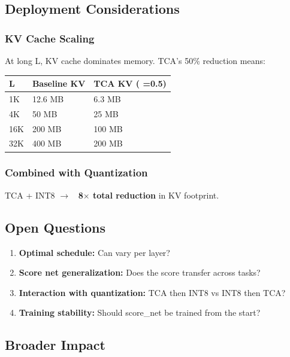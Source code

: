 \subsection{Deployment Considerations}

\subsubsection{KV Cache Scaling}

At long L, KV cache dominates memory. TCA's 50\% reduction means:

\begin{table}[H]
\centering
\small
\begin{tabular}{lll}
\toprule
\textbf{L} & \textbf{Baseline KV} & \textbf{TCA KV ( =0.5)} \\
\midrule
1K & 12.6 MB & 6.3 MB \\
4K & 50 MB & 25 MB \\
16K & 200 MB & 100 MB \\
32K & 400 MB & 200 MB \\
\bottomrule
\end{tabular}
\end{table}

\subsubsection{Combined with Quantization}

TCA + INT8 $\to$ \textbf{~8$\times$ total reduction} in KV footprint.

\subsection{Open Questions}

\begin{enumerate}
\item \textbf{Optimal   schedule:} Can   vary per layer?
\item \textbf{Score net generalization:} Does the score transfer across tasks?
\item \textbf{Interaction with quantization:} TCA then INT8 vs INT8 then TCA?
\item \textbf{Training stability:} Should score\_net be trained from the start?

\end{enumerate}
\subsection{Broader Impact}

